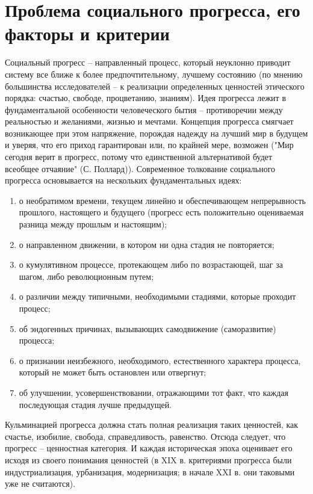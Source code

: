 \documentclass[12pt]{article}
\begin{document}
\section{Проблема социального прогресса, его факторы и критерии}
Социальный  прогресс  –  направленный  процесс,  который  неуклонно  приводит  систему  все  ближе  к  более
предпочтительному,  лучшему  состоянию  (по  мнению  большинства  исследователей  –  к  реализации
определенных ценностей этического порядка: счастью, свободе, процветанию, знаниям).
Идея  прогресса  лежит  в  фундаментальной  особенности  человеческого  бытия  –  противоречии  между
реальностью  и  желаниями,  жизнью  и  мечтами.  Концепция  прогресса  смягчает  возникающее  при  этом
напряжение, порождая надежду на лучший мир в будущем и уверяя, что его приход гарантирован или, по
крайней  мере,  возможен  ("Мир  сегодня  верит  в  прогресс,  потому  что  единственной  альтернативой  будет
всеобщее отчаяние" (С. Поллард)).
Современное толкование социального прогресса основывается на нескольких фундаментальных идеях:
\begin{enumerate} 
\item о
необратимом времени, текущем линейно и обеспечивающем непрерывность прошлого, настоящего и будущего
(прогресс  есть  положительно  оцениваемая  разница  между  прошлым  и  настоящим);
\item о  направленном
движении, в котором ни одна стадия не повторяется;
\item о кумулятивном процессе, протекающем либо по
возрастающей, шаг за шагом, либо революционным путем;
\item о различии между типичными, необходимыми
стадиями, которые проходит процесс;
\item об эндогенных причинах, вызывающих самодвижение (саморазвитие)
процесса;
\item о признании неизбежного, необходимого, естественного характера процесса, который не может
быть остановлен или отвергнут;
\item об улучшении, усовершенствовании, отражающими тот факт, что каждая
последующая стадия лучше предыдущей.
\end{enumerate}
Кульминацией прогресса должна стать полная реализация таких ценностей, как счастье, изобилие, свобода,
справедливость, равенство. Отсюда следует, что прогресс – ценностная категория. И каждая историческая эпоха
оценивает его исходя из своего понимания ценностей (в XIX в. критериями прогресса были индустриализация,
урбанизация, модернизация; в начале XXI в. они таковыми уже не считаются).
\end{document}
